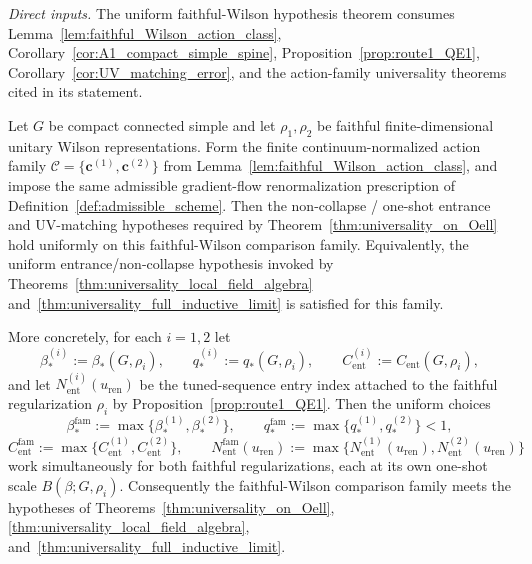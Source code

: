 \noindent\emph{Direct inputs.} The uniform faithful-Wilson hypothesis theorem consumes Lemma~\ref{lem:faithful_Wilson_action_class}, Corollary~\ref{cor:A1_compact_simple_spine}, Proposition~\ref{prop:route1_QE1}, Corollary~\ref{cor:UV_matching_error}, and the action-family universality theorems cited in its statement.\par

\begin{theorem}
\label{thm:faithful_Wilson_uniform_hypotheses}
Let $G$ be compact connected simple and let $\rho_1,\rho_2$ be faithful finite-dimensional unitary Wilson representations.
Form the finite continuum-normalized action family $\mathcal C=\{\mathbf c^{(1)},\mathbf c^{(2)}\}$ from Lemma~\ref{lem:faithful_Wilson_action_class}, and impose the same admissible gradient-flow renormalization prescription of Definition~\ref{def:admissible_scheme}.
Then the non-collapse / one-shot entrance and UV-matching hypotheses required by Theorem~\ref{thm:universality_on_Oell} hold uniformly on this faithful-Wilson comparison family.
Equivalently, the uniform entrance/non-collapse hypothesis invoked by Theorems~\ref{thm:universality_local_field_algebra} and~\ref{thm:universality_full_inductive_limit} is satisfied for this family.

More concretely, for each $i=1,2$ let
\[
\beta_\ast^{(i)}:=\beta_\ast(G,\rho_i),
\qquad
q_\ast^{(i)}:=q_\ast(G,\rho_i),
\qquad
C_{\mathrm{ent}}^{(i)}:=C_{\mathrm{ent}}(G,\rho_i),
\]
and let $N_{\mathrm{ent}}^{(i)}(u_{\mathrm{ren}})$ be the tuned-sequence entry index attached to the faithful regularization $\rho_i$ by Proposition~\ref{prop:route1_QE1}.
Then the uniform choices
\[
\beta_\ast^{\mathrm{fam}}:=\max\{\beta_\ast^{(1)},\beta_\ast^{(2)}\},
\qquad
q_\ast^{\mathrm{fam}}:=\max\{q_\ast^{(1)},q_\ast^{(2)}\}<1,
\]
\[
C_{\mathrm{ent}}^{\mathrm{fam}}:=\max\{C_{\mathrm{ent}}^{(1)},C_{\mathrm{ent}}^{(2)}\},
\qquad
N_{\mathrm{ent}}^{\mathrm{fam}}(u_{\mathrm{ren}}):=\max\{N_{\mathrm{ent}}^{(1)}(u_{\mathrm{ren}}),N_{\mathrm{ent}}^{(2)}(u_{\mathrm{ren}})\}
\]
work simultaneously for both faithful regularizations, each at its own one-shot scale $B(\beta;G,\rho_i)$.
Consequently the faithful-Wilson comparison family meets the hypotheses of
Theorems~\ref{thm:universality_on_Oell}, \ref{thm:universality_local_field_algebra}, and~\ref{thm:universality_full_inductive_limit}.
\end{theorem}


